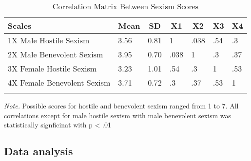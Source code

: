 \documentclass[
  english,
  man,floatsintext]{apa6}
\begin{document}
\begin{table}[tbp]

\begin{center}
\begin{threeparttable}

\caption{\label{tab:unnamed-chunk-2}Correlation Matrix Between Sexism Scores}

\begin{tabular}{lllllll}
\toprule
Scales & \multicolumn{1}{c}{Mean} & \multicolumn{1}{c}{SD} & \multicolumn{1}{c}{X1} & \multicolumn{1}{c}{X2} & \multicolumn{1}{c}{X3} & \multicolumn{1}{c}{X4}\\
\midrule
1X Male Hostile Sexism & 3.56 & 0.81 & 1 & .038 & .54 & .3\\
2X Male Benevolent Sexism & 3.95 & 0.70 & .038 & 1 & .3 & .37\\
3X Female Hostile Sexism & 3.23 & 1.01 & .54 & .3 & 1 & .53\\
4X Female Benevolent Sexism & 3.71 & 0.72 & .3 & .37 & .53 & 1\\
\bottomrule
\addlinespace
\end{tabular}

\begin{tablenotes}[para]
\normalsize{\textit{Note.} Possible scores for hostile and benevolent sexism ranged from 1 to 7. All correlations except for male hostile sexism with male benevolent sexism was statistically signficinat with p < .01}
\end{tablenotes}

\end{threeparttable}
\end{center}

\end{table}

\hypertarget{data-analysis}{%
\subsection{Data analysis}\label{data-analysis}}
\end{document}
